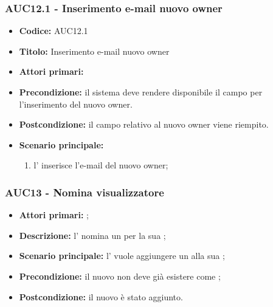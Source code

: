 \documentclass[casi-duso]{subfiles}
\begin{document}
\subsubsection{AUC12.1 - Inserimento e-mail nuovo owner}%
\label{subsub:AUC12.1}
\begin{itemize}
  \item \textbf{Codice:} AUC12.1
  \item \textbf{Titolo:} Inserimento e-mail nuovo owner
  \item \textbf{Attori primari:} 
  \item \textbf{Precondizione:} il sistema deve rendere disponibile il campo per l'inserimento del nuovo owner.
  \item \textbf{Postcondizione:} il campo relativo al nuovo owner viene riempito.
  \item \textbf{Scenario principale:} 
  \begin{enumerate}
    \item l'  inserisce l'e-mail del nuovo owner;
  \end{enumerate}
\end{itemize}


\subsubsection{AUC13 - Nomina visualizzatore}%
\label{subsub:AUC13}
\begin{itemize}
  \item \textbf{Attori primari:} ;
  \item \textbf{Descrizione:} l'  nomina un  per la sua ;
  \item \textbf{Scenario principale:} l'  vuole aggiungere un  alla sua ;
  \item \textbf{Precondizione:} il nuovo  non deve già esistere come ;
  \item \textbf{Postcondizione:} il nuovo  è stato aggiunto.
\end{itemize}
\end{document}
